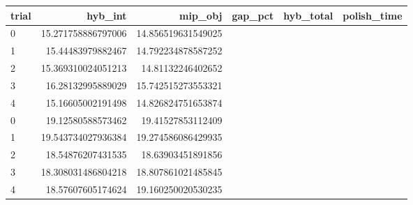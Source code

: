 \begin{tabular}{lrrrrr}
\hline
trial & hyb_int & mip_obj & gap_pct & hyb_total & polish_time \\ \hline
0 & 15.271758886797006 & 14.856519631549025 &  &  &  \\
1 & 15.44483979882467 & 14.792234878587252 &  &  &  \\
2 & 15.369310024051213 & 14.81132246402652 &  &  &  \\
3 & 16.28132995889029 & 15.742515273553321 &  &  &  \\
4 & 15.16605002191498 & 14.826824751653874 &  &  &  \\
0 & 19.12580588573462 & 19.41527853112409 &  &  &  \\
1 & 19.543734027936384 & 19.274586086429935 &  &  &  \\
2 & 18.54876207431535 & 18.63903451891856 &  &  &  \\
3 & 18.308031486804218 & 18.807861021485845 &  &  &  \\
4 & 18.57607605174624 & 19.160250020530235 &  &  &  \\
\hline
\end{tabular}
